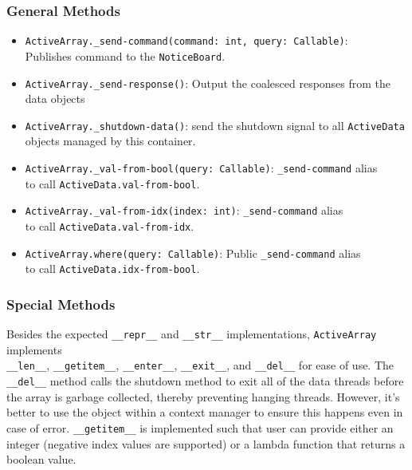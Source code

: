 \documentclass[10pt]{article}
\begin{document}
	\subsubsection{General Methods}
		\begin{itemize}
			\item \lstinline|ActiveArray._send-command(command: int, query: Callable)|:\\ Publishes command to the \lstinline|NoticeBoard|.
			
			\item \lstinline|ActiveArray._send-response()|: Output the coalesced responses from the data objects
			
			\item \lstinline|ActiveArray._shutdown-data()|: send the shutdown signal to all \lstinline|ActiveData| objects managed by this container.
			
			\item \lstinline|ActiveArray._val-from-bool(query: Callable)|: \lstinline|_send-command| alias\\to call \lstinline|ActiveData.val-from-bool|.
			
			\item \lstinline|ActiveArray._val-from-idx(index: int)|: \lstinline|_send-command| alias\\to call \lstinline|ActiveData.val-from-idx|.
			
			\item \lstinline|ActiveArray.where(query: Callable)|: Public \lstinline|_send-command| alias\\to call \lstinline|ActiveData.idx-from-bool|.
		\end{itemize}
	\subsubsection{Special Methods}
		Besides the expected \lstinline|__repr__| and \lstinline|__str__| implementations, \lstinline|ActiveArray| implements\\
		\lstinline|__len__|, \lstinline|__getitem__|, \lstinline|__enter__|, \lstinline|__exit__|, and \lstinline|__del__| for ease of use. The \lstinline|__del__| method calls the shutdown method to exit all of the data threads before the array is garbage collected, thereby preventing hanging threads. However, it's better to use the object within a context manager to ensure this happens even in case of error.
		\lstinline|__getitem__| is implemented such that user can provide either an integer (negative index values are supported) or a lambda function that returns a boolean value.
		
\end{document}

